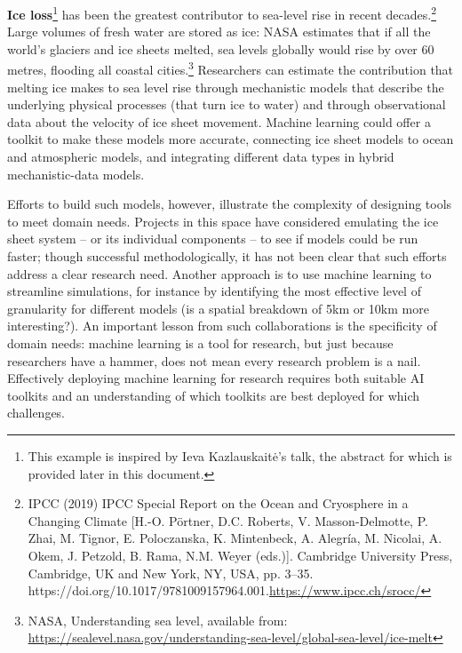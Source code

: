 {\textbf{Ice loss}\footnote{This example is inspired by Ieva
  Kazlauskaitė's talk, the abstract for which is provided later in this
  document.} has been the greatest contributor to sea-level rise in
recent decades.\footnote{IPCC (2019) IPCC Special Report on the Ocean
  and Cryosphere in a Changing Climate {[}H.-O. Pörtner, D.C. Roberts,
  V. Masson-Delmotte, P. Zhai, M. Tignor, E. Poloczanska, K. Mintenbeck,
  A. Alegría, M. Nicolai, A. Okem, J. Petzold, B. Rama, N.M. Weyer
  (eds.){]}. Cambridge University Press, Cambridge, UK and New York, NY,
  USA, pp. 3--35.
  https://doi.org/10.1017/9781009157964.001.\href{https://www.ipcc.ch/srocc/}{\uline{https://www.ipcc.ch/srocc/}}}
Large volumes of fresh water are stored as ice: NASA estimates that if
all the world's glaciers and ice sheets melted, sea levels globally
would rise by over 60 metres, flooding all coastal cities.\footnote{NASA,
  Understanding sea level, available from:
  \href{https://sealevel.nasa.gov/understanding-sea-level/global-sea-level/ice-melt}{\uline{https://sealevel.nasa.gov/understanding-sea-level/global-sea-level/ice-melt}}}
Researchers can estimate the contribution that melting ice makes to sea
level rise through mechanistic models that describe the underlying
physical processes (that turn ice to water) and through observational
data about the velocity of ice sheet movement. Machine learning could
offer a toolkit to make these models more accurate, connecting ice sheet
models to ocean and atmospheric models, and integrating different data
types in hybrid mechanistic-data models.

Efforts to build such models, however, illustrate the complexity of
designing tools to meet domain needs. Projects in this space have
considered emulating the ice sheet system -- or its individual
components -- to see if models could be run faster; though successful
methodologically, it has not been clear that such efforts address a
clear research need. Another approach is to use machine learning to
streamline simulations, for instance by identifying the most effective
level of granularity for different models (is a spatial breakdown of 5km
or 10km more interesting?). An important lesson from such collaborations
is the specificity of domain needs: machine learning is a tool for
research, but just because researchers have a hammer, does not mean
every research problem is a nail. Effectively deploying machine learning
for research requires both suitable AI toolkits and an understanding of
which toolkits are best deployed for which challenges.

}

